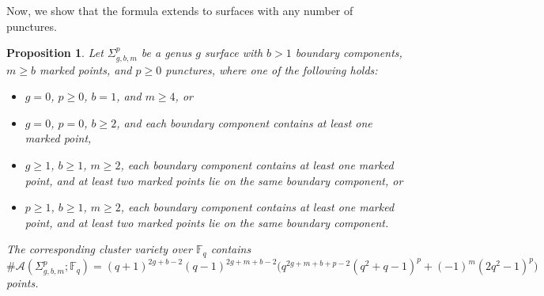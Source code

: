 \documentclass[reqno,12pt]{amsart}
\newtheorem{prop}[thm]{Proposition}
\theoremstyle{definition}
\theoremstyle{remark}
\theoremstyle{remark}
\numberwithin{equation}{section}
\begin{document}
Now, we show that the formula extends to surfaces with any number of punctures.
\begin{prop}\label{prop: punctured count}
    Let $\Sigma_{g,b,m}^p$ be a genus $g$ surface with $b>1$ boundary components, $m\geq b$ marked points, and $p\geq 0$ punctures, where one of the following holds:
    \begin{itemize}
        \item $g=0$, $p\geq 0$, $b=1$, and $m\geq 4$, or
        \item $g=0$, $p=0$, $b\geq 2$, and each boundary component contains at least one marked point,
        \item $g \geq 1$, $b \geq 1$, $m\geq 2$, each boundary component contains at least one marked point, and at least two marked points lie on the same boundary component, or
        \item $p \geq 1$, $b \geq 1$, $m\geq 2$, each boundary component contains at least one marked point, and at least two marked points lie on the same boundary component. 
    \end{itemize}
    The corresponding cluster variety over $\mathbb{F}_q$ contains 
    \[ \#\mathcal{A}(\Sigma_{g,b,m}^p; \mathbb{F}_q) = (q+1)^{2g+b-2} (q-1)^{2g+m+b-2} \big( q^{2g+m+b+p-2} (q^2+q-1)^p + (-1)^m (2q^2-1)^p \big) \]
    points.
\end{prop}
\end{document}
